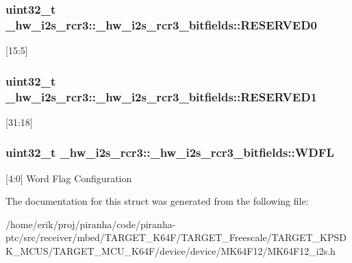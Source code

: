 \subsubsection[{\texorpdfstring{R\+E\+S\+E\+R\+V\+E\+D0}{RESERVED0}}]{\setlength{\rightskip}{0pt plus 5cm}uint32\+\_\+t \+\_\+hw\+\_\+i2s\+\_\+rcr3\+::\+\_\+hw\+\_\+i2s\+\_\+rcr3\+\_\+bitfields\+::\+R\+E\+S\+E\+R\+V\+E\+D0}\hypertarget{struct__hw__i2s__rcr3_1_1__hw__i2s__rcr3__bitfields_a751da5da2da09be18b648b3281bdf331}{}\label{struct__hw__i2s__rcr3_1_1__hw__i2s__rcr3__bitfields_a751da5da2da09be18b648b3281bdf331}
\mbox{[}15\+:5\mbox{]} 
\subsubsection[{\texorpdfstring{R\+E\+S\+E\+R\+V\+E\+D1}{RESERVED1}}]{\setlength{\rightskip}{0pt plus 5cm}uint32\+\_\+t \+\_\+hw\+\_\+i2s\+\_\+rcr3\+::\+\_\+hw\+\_\+i2s\+\_\+rcr3\+\_\+bitfields\+::\+R\+E\+S\+E\+R\+V\+E\+D1}\hypertarget{struct__hw__i2s__rcr3_1_1__hw__i2s__rcr3__bitfields_a6dc0c9cc5cdbb9dfa1e69fc579737865}{}\label{struct__hw__i2s__rcr3_1_1__hw__i2s__rcr3__bitfields_a6dc0c9cc5cdbb9dfa1e69fc579737865}
\mbox{[}31\+:18\mbox{]} 
\subsubsection[{\texorpdfstring{W\+D\+FL}{WDFL}}]{\setlength{\rightskip}{0pt plus 5cm}uint32\+\_\+t \+\_\+hw\+\_\+i2s\+\_\+rcr3\+::\+\_\+hw\+\_\+i2s\+\_\+rcr3\+\_\+bitfields\+::\+W\+D\+FL}\hypertarget{struct__hw__i2s__rcr3_1_1__hw__i2s__rcr3__bitfields_ad8d2f4ce6e4a5101d4ff6d4752ce76df}{}\label{struct__hw__i2s__rcr3_1_1__hw__i2s__rcr3__bitfields_ad8d2f4ce6e4a5101d4ff6d4752ce76df}
\mbox{[}4\+:0\mbox{]} Word Flag Configuration 

The documentation for this struct was generated from the following file\+:\begin{DoxyCompactItemize}
\item 
/home/erik/proj/piranha/code/piranha-\/ptc/src/receiver/mbed/\+T\+A\+R\+G\+E\+T\+\_\+\+K64\+F/\+T\+A\+R\+G\+E\+T\+\_\+\+Freescale/\+T\+A\+R\+G\+E\+T\+\_\+\+K\+P\+S\+D\+K\+\_\+\+M\+C\+U\+S/\+T\+A\+R\+G\+E\+T\+\_\+\+M\+C\+U\+\_\+\+K64\+F/device/device/\+M\+K64\+F12/M\+K64\+F12\+\_\+i2s.\+h\end{DoxyCompactItemize}
